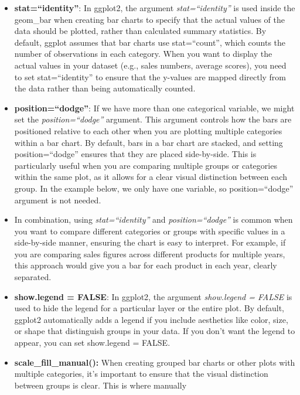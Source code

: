 \documentclass[
  letterpaper,
  DIV=11,
  numbers=noendperiod]{scrreprt}
\providecommand{\tightlist}{%
  \setlength{\itemsep}{0pt}\setlength{\parskip}{0pt}}\usepackage{longtable,booktabs,array}
\begin{document}
\begin{itemize}
\tightlist
\item
  \textbf{stat=``identity''}: In ggplot2, the argument
  \emph{stat=``identity''} is used inside the geom\_bar when creating
  bar charts to specify that the actual values of the data should be
  plotted, rather than calculated summary statistics. By default, ggplot
  assumes that bar charts use stat=``count'', which counts the number of
  observations in each category. When you want to display the actual
  values in your dataset (e.g., sales numbers, average scores), you need
  to set stat=``identity'' to ensure that the y-values are mapped
  directly from the data rather than being automatically counted.
\item
  \textbf{position=``dodge''}: If we have more than one categorical
  variable, we might set the \emph{position=``dodge''} argument. This
  argument controls how the bars are positioned relative to each other
  when you are plotting multiple categories within a bar chart. By
  default, bars in a bar chart are stacked, and setting
  position=``dodge'' ensures that they are placed side-by-side. This is
  particularly useful when you are comparing multiple groups or
  categories within the same plot, as it allows for a clear visual
  distinction between each group. In the example below, we only have one
  variable, so position=``dodge'' argument is not needed.\\
\item
  In combination, using \emph{stat=``identity''} and
  \emph{position=``dodge''} is common when you want to compare different
  categories or groups with specific values in a side-by-side manner,
  ensuring the chart is easy to interpret. For example, if you are
  comparing sales figures across different products for multiple years,
  this approach would give you a bar for each product in each year,
  clearly separated.
\item
  \textbf{show.legend = FALSE}: In ggplot2, the argument
  \emph{show.legend = FALSE} is used to hide the legend for a particular
  layer or the entire plot. By default, ggplot2 automatically adds a
  legend if you include aesthetics like color, size, or shape that
  distinguish groups in your data. If you don't want the legend to
  appear, you can set show.legend = FALSE.
\item
  \textbf{scale\_fill\_manual():} When creating grouped bar charts or
  other plots with multiple categories, it's important to ensure that
  the visual distinction between groups is clear. This is where manually

\end{itemize}
\end{document}

